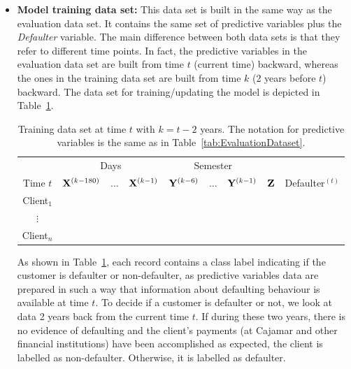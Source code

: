 \begin{itemize}
\item \textbf{Model training data set:}  This data set is built in the same way as the evaluation data set. It contains the same set of predictive variables plus the \textit{Defaulter} variable. The main difference between both data sets is that they refer to different time points. In fact, the predictive variables in the evaluation data set are built from time $t$ (current time) backward, whereas the ones in the training data set are built from time $k$ (2 years before $t$) backward. The data set for training/updating the model is depicted in Table~\ref{tab:TrainingDataset}.
\begin{table}[h]
\centering
\begin{tabular}{c|ccc|ccc|c|c}
	&\multicolumn{3}{c|}{Days} & \multicolumn{3}{c|}{Semester} & \\
     Time $t$              & $\mathbf{X}^{(k-180)}$ & $\ldots$ & $\mathbf{X}^{(k-1)} $ & $\mathbf{Y}^{(k-6)}$  & $\ldots$ & $\mathbf{Y}^{(k-1)} $ & $\mathbf{Z}$ & Defaulter$^{(t)}$\\  
\hline
Client$_1$  &                                                  &              &                     &                               &                     &        &  \\ 
$\vdots$      &                                                 &               &                     &                                &                     &       & \\ 
Client$_n$  &                                                &               &                     &                                &                     &     & \\ 
\end{tabular} 
\caption{Training data set at time $t$ with $k=t - 2$ years.  The notation for predictive variables is the same as in Table~\ref{tab:EvaluationDataset}.}
\label{tab:TrainingDataset} 
\end{table}

As shown in Table~\ref{tab:TrainingDataset}, each record contains a class label indicating if the customer is defaulter or non-defaulter, as predictive variables data are prepared in such a way that information about defaulting behaviour is available at time $t$. To decide if a customer is defaulter or not, we look at data 2 years back from the current time $t$. If during these two years, there is no evidence of defaulting and the client's payments (at Cajamar and other financial institutions) have been accomplished as expected, the client is labelled as non-defaulter. Otherwise, it is labelled as defaulter.
\end{itemize}

